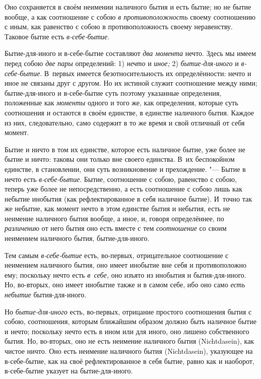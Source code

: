 Оно сохраняется в своём неимении наличного бытия и есть бытие; но не бытие
вообще, а как соотношение с собою {\em в
противоположность} своему соотношению с иным, как равенство с собою в
противоположность своему неравенству. Таковое бытие есть
{\em в-себе-бытие}.

Бытие-для-иного и в-себе-бытие составляют {\em два момента} нечто. Здесь
мы имеем перед собою {\em две пары} определений: 1) {\em нечто} и
{\em иное;} 2) {\em бытие-для-иного} и {\em в-себе-бытие}. В~первых имеется
безотносительность их определённости: нечто и иное не связаны друг с
другом. Но их истиной служит соотношение между ними; бытие-для-иного и
в-себе-бытие суть поэтому указанные определения, положенные как
{\em моменты} одного и того же, как определения,
которые суть соотношения и остаются в своём единстве, в единстве наличного
бытия. Каждое из них, следовательно, само содержит в то же время
и свой отличный от себя момент.

Бытие и ничто в том их единстве, которое есть наличное бытие, уже более не
бытие и ничто: таковы они только вне своего единства. В~их беспокойном
единстве, в становлении, они суть возникновение и прехождение. "--- Бытие в
нечто есть {\em в-себе-бытие}. Бытие, соотношение с
собою, равенство с собою, теперь уже более не непосредственно, а есть
соотношение с собою лишь как небытие инобытия (как рефлектированное в себя
наличное бытие). И~точно так же небытие, как момент нечто в этом единстве
бытия и небытия, есть не неимение наличного бытия вообще, а иное, и,
говоря определённее, по {\em различению} от него бытия
оно есть вместе с тем {\em соотношение} со своим
неимением наличного бытия, бытие-для-иного.

Тем самым {\em в-себе-бытие} есть, во-первых,
отрицательное соотношение с неимением наличного бытия, оно имеет инобытие
вне себя и противоположно ему; поскольку нечто есть
{\em в~себе,} оно изъято из инобытия и бытия-для-иного.
Но, во-вторых, оно имеет инобытие также и в самом себе, ибо оно
само {\em есть небытие} бытия-для-иного.

Но {\em бытие-для-иного} есть, во-первых, отрицание
простого соотношения бытия с собою, соотношения, которым ближайшим образом
должно быть наличное бытие и нечто; поскольку нечто есть в ином
или для иного, оно лишено собственного бытия. Но, во-вторых,
оно не есть неимение наличного бытия (Nicht\-dasein), как чистое ничто. Оно
есть неимение наличного бытия (Nicht\-dasein), указующее на в-себе-бытие, как
на своё рефлектированное в себя бытие, равно как и наоборот, в-себе-бытие
указует на бытие-для-иного.

